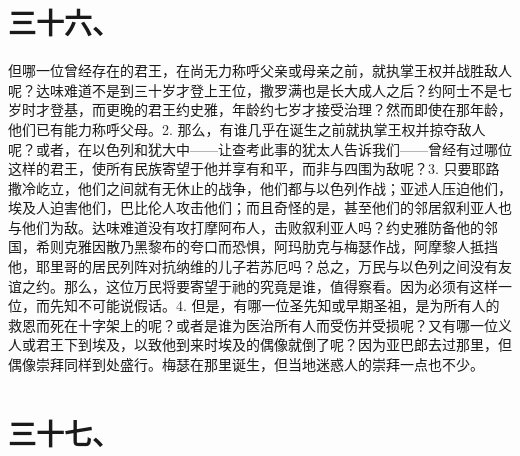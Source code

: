 \section{三十六、}

但哪一位曾经存在的君王，在尚无力称呼父亲或母亲之前，就执掌王权并战胜敌人呢？达味难道不是到三十岁才登上王位，撒罗满也是长大成人之后？约阿士不是七岁时才登基，而更晚的君王约史雅，年龄约七岁才接受治理？然而即使在那年龄，他们已有能力称呼父母。\newline{}2. 那么，有谁几乎在诞生之前就执掌王权并掠夺敌人呢？或者，在以色列和犹大中——让查考此事的犹太人告诉我们——曾经有过哪位这样的君王，使所有民族寄望于他并享有和平，而非与四围为敌呢？\newline{}3. 只要耶路撒冷屹立，他们之间就有无休止的战争，他们都与以色列作战；亚述人压迫他们，埃及人迫害他们，巴比伦人攻击他们；而且奇怪的是，甚至他们的邻居叙利亚人也与他们为敌。达味难道没有攻打摩阿布人，击败叙利亚人吗？约史雅防备他的邻国，希则克雅因散乃黑黎布的夸口而恐惧，阿玛肋克与梅瑟作战，阿摩黎人抵挡他，耶里哥的居民列阵对抗纳维的儿子若苏厄吗？总之，万民与以色列之间没有友谊之约。那么，这位万民将要寄望于祂的究竟是谁，值得察看。因为必须有这样一位，而先知不可能说假话。\newline{}4. 但是，有哪一位圣先知或早期圣祖，是为所有人的救恩而死在十字架上的呢？或者是谁为医治所有人而受伤并受损呢？又有哪一位义人或君王下到埃及，以致他到来时埃及的偶像就倒了呢？因为亚巴郎去过那里，但偶像崇拜同样到处盛行。梅瑟在那里诞生，但当地迷惑人的崇拜一点也不少。\par


\section{三十七、}

